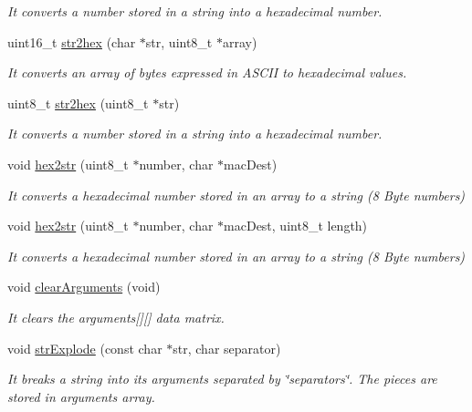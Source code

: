 \begin{DoxyCompactItemize}
\begin{DoxyCompactList}\small\item\em It converts a number stored in a string into a hexadecimal number. \end{DoxyCompactList}\item 
uint16\+\_\+t \hyperlink{class_wasp_utils_a4e83cf8e4421091a50c58b17da3fb20e}{str2hex} (char $\ast$str, uint8\+\_\+t $\ast$array)
\begin{DoxyCompactList}\small\item\em It converts an array of bytes expressed in A\+S\+C\+II to hexadecimal values. \end{DoxyCompactList}\item 
uint8\+\_\+t \hyperlink{class_wasp_utils_a4649e1fb3f9d1f3695c3e1cdad920dd5}{str2hex} (uint8\+\_\+t $\ast$str)
\begin{DoxyCompactList}\small\item\em It converts a number stored in a string into a hexadecimal number. \end{DoxyCompactList}\item 
void \hyperlink{class_wasp_utils_a50b59b8aaea582078b0bebe4404dc714}{hex2str} (uint8\+\_\+t $\ast$number, char $\ast$mac\+Dest)
\begin{DoxyCompactList}\small\item\em It converts a hexadecimal number stored in an array to a string (8 Byte numbers) \end{DoxyCompactList}\item 
void \hyperlink{class_wasp_utils_a8e879eb2cb74f6b0bd03e066cbbf0486}{hex2str} (uint8\+\_\+t $\ast$number, char $\ast$mac\+Dest, uint8\+\_\+t length)
\begin{DoxyCompactList}\small\item\em It converts a hexadecimal number stored in an array to a string (8 Byte numbers) \end{DoxyCompactList}\item 
void \hyperlink{class_wasp_utils_a63e4c625866e35aa5e0d6da363dda750}{clear\+Arguments} (void)
\begin{DoxyCompactList}\small\item\em It clears the arguments\mbox{[}\mbox{]}\mbox{[}\mbox{]} data matrix. \end{DoxyCompactList}\item 
void \hyperlink{class_wasp_utils_a4dd69b8870f965778e777936b0542c64}{str\+Explode} (const char $\ast$str, char separator)
\begin{DoxyCompactList}\small\item\em It breaks a string into its arguments separated by \char`\"{}separators\char`\"{}. The pieces are stored in \textquotesingle{}arguments\textquotesingle{} array. \end{DoxyCompactList}\item 

\end{DoxyCompactItemize}
